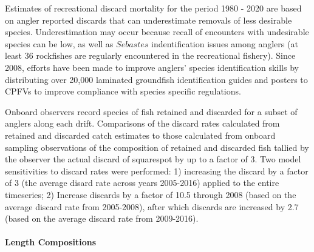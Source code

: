 \documentclass[11pt,
  english,
  a4paper,
]{article}
\begin{document}
\leavevmode\tagmcend\tagstructend\par


Estimates of recreational discard mortality for the period 1980 - 2020 are based on angler reported discards that can underestimate removals of less desirable species. Underestimation may occur because recall of encounters with undesirable species can be low, as well as {\(Sebastes\)\leavevmode\tagmcend\tagstructend} indentification issues among anglers (at least 36 rockfishes are regularly encountered in the recreational fishery). Since 2008, efforts have been made to improve anglers' species identification skills by distributing over 20,000 laminated groundfish identification guides and posters to CPFVs to improve compliance with species specific regulations.

\leavevmode\tagmcend\tagstructend\par


Onboard observers record species of fish retained and discarded for a subset of anglers along each drift. Comparisons of the discard rates calculated from retained and discarded catch estimates to those calculated from onboard sampling observations of the composition of retained and discarded fish tallied by the observer the actual discard of squarespot by up to a factor of 3. Two model sensitivities to discard rates were performed: 1) increasing the discard by a factor of 3 (the average disard rate across years 2005-2016) applied to the entire timeseries; 2) Increase discards by a factor of 10.5 through 2008 (based on the average discard rate from 2005-2008), after which discards are increased by 2.7 (based on the average discard rate from 2009-2016).

\leavevmode\tagmcend\tagstructend\par


\hypertarget{length-compositions}{%
\paragraph{Length Compositions}\label{length-compositions}}

\leavevmode\tagmcend\tagstructend

\end{document}
